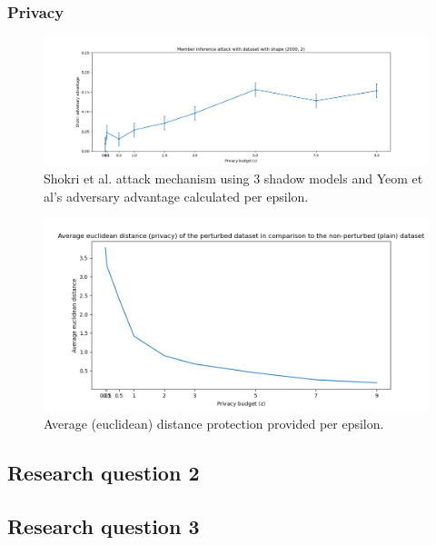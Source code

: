 \subsubsection{Privacy}

\begin{figure}[!htb]
  \includegraphics[width=1\linewidth]{Results/rq1/shokri_privacy_adv_2000.png}
  \caption{Shokri et al. attack mechanism using 3 shadow models and Yeom et al's adversary advantage calculated per epsilon.}
\end{figure}
\begin{figure}[!htb]
  \includegraphics[width=1\linewidth]{Results/rq1/avg_euclidean.png}
  \caption{Average (euclidean) distance protection provided per epsilon.}
\end{figure}
\subsection{Research question 2}
\subsection{Research question 3}